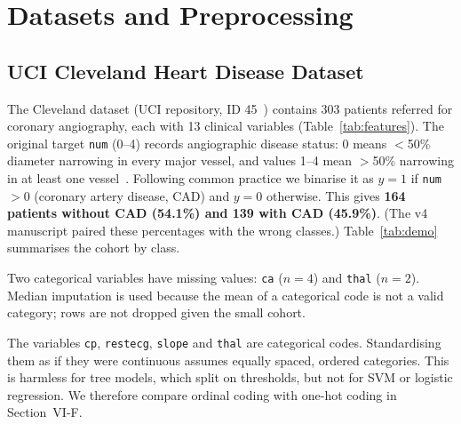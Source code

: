 \section{Datasets and Preprocessing}
\subsection{UCI Cleveland Heart Disease Dataset}
The Cleveland dataset (UCI repository, ID 45~\cite{janosi1989}) contains 303 patients referred for coronary angiography, each with 13 clinical variables (Table~\ref{tab:features}). The original target \texttt{num} (0--4) records angiographic disease status: 0 means $<$50\% diameter narrowing in every major vessel, and values 1--4 mean $>$50\% narrowing in at least one vessel~\cite{detrano1989}. Following common practice we binarise it as $y=1$ if \texttt{num}$>0$ (coronary artery disease, CAD) and $y=0$ otherwise. This gives \textbf{164 patients without CAD (54.1\%) and 139 with CAD (45.9\%)}. (The v4 manuscript paired these percentages with the wrong classes.) Table~\ref{tab:demo} summarises the cohort by class.

Two categorical variables have missing values: \texttt{ca} ($n=4$) and \texttt{thal} ($n=2$). Median imputation is used because the mean of a categorical code is not a valid category; rows are not dropped given the small cohort. 

The variables \texttt{cp}, \texttt{restecg}, \texttt{slope} and \texttt{thal} are categorical codes. Standardising them as if they were continuous assumes equally spaced, ordered categories. This is harmless for tree models, which split on thresholds, but not for SVM or logistic regression. We therefore compare ordinal coding with one-hot coding in Section~VI-F.

